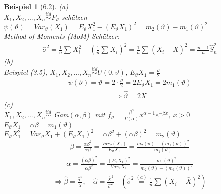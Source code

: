 \documentclass[a4paper,openany]{book}
\theoremstyle{mytheoremstyle}
\newtheorem*{bei}{Beispiel}
\theoremstyle{mytheoremstyle2}
\begin{document}
\begin{bei}[6.2]
  (a)\\ $X_1,X_2,...,X_n \overset{iid}\sim P _{\vartheta }$ schätzen \\
  $\psi (\vartheta )=Var _{\vartheta }(X_1)=E _{\vartheta }X_1^2-(E _{\vartheta }X_1)^2=m_2(\vartheta )-m_1(\vartheta )^2$ \\
  Method of Moments (MoM) Schätzer: 
  \begin{align*}
    \hat{\sigma }^2=\frac{1}{n}\sum_{}^{}{X_i^2}-\left(\frac{1}{n}\sum_{}^{}{X_i}\right)^2=\frac{1}{n}\sum_{}^{}{(X_i-\bar{X})^2} =\frac{n-1}{n}\hat{S}_n^2
  \end{align*}
  (b)\\
  Beispiel (3.5), $X_1,X_2,...,X_n \overset{iid}\sim U(0, \vartheta )$, $E _{\vartheta }X_1=\frac{\vartheta }{2}$  
  \begin{align*}
    \psi (\vartheta )=\vartheta =2 \cdot \frac{\vartheta }{2}=2E _{\vartheta }X_1=2 m_1(\vartheta )
  \end{align*}
  \begin{align*}
    \Rightarrow \hat{\vartheta }=2 \bar{X}
  \end{align*}
  (c)\\
  $X_1,X_2,...,X_n \overset{iid}\sim$ Gam$(\alpha ,\beta )$ mit $f _{\vartheta }=\frac{\beta ^{\alpha }}{\Gamma (\alpha )}x ^{\alpha -1}e^{-\beta x}$, $x>0$ \\
$E _{\vartheta }X_1=\alpha \beta =m_1(\vartheta )$ \\
$E _{\vartheta }X_1^2=Var _{\vartheta }X_1+(E _{\vartheta }X_1)^2=\alpha \beta ^2+(\alpha \beta )^2=m_2(\vartheta )$
\begin{align*}
  \beta =\frac{\alpha \beta ^2}{\alpha \beta }=\frac{Var _{\vartheta }(X_1)}{E _{\vartheta }X_1}=\frac{m_2(\vartheta )-(m_1(\vartheta ))^2}{m_1(\vartheta )}
\end{align*}
\begin{align*}
  \alpha =\frac{(\alpha \beta )^2}{\alpha \beta ^2}=\frac{(E _{\vartheta }X_1)^2}{Var _{\vartheta }X_1}=\frac{m_1(\vartheta )^2}{m_2(\vartheta )-(m_1(\vartheta ))^2}
\end{align*}
\begin{align*}
  \Rightarrow \hat{\beta }=\frac{\hat{\sigma }^2}{\bar{X}},\quad \hat{\alpha }=\frac{\bar{X}^2}{\hat{\sigma}^2}\quad (\hat{\sigma }^2 \overset{(a)}=\frac{1}{n}\sum_{}^{}{(X_i-\bar{X})^2})
\end{align*}
\end{bei}
\end{document}
